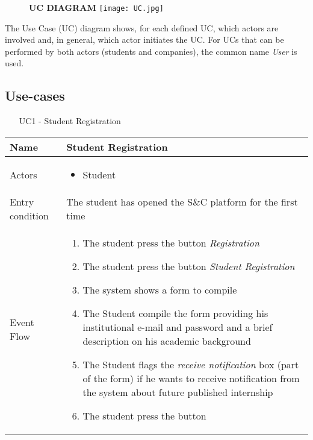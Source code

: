 			\begin{figure}[H]
				\centering
				{\bfseries UC DIAGRAM}
				\texttt{[image: UC.jpg]}
				
			\end{figure}
			
			The Use Case (UC) diagram shows, for each defined UC, which actors are involved and, in general, which actor initiates the UC. For UCs that can be performed by both actors (students and companies), the common name \textit{User} is used.
			
			
			
		\subsection{Use-cases}
			
			\begin{table} [H]
				\centering
				\begin{itemize}
					\item [UC1] - Student Registration
				\end{itemize}
				\begin{tabular}{|| P{7.5cm} | P{7.5cm} ||}
					\hline
					Name & Student Registration \\
					\hline
					Actors & \parbox{5cm}{\begin{itemize}
							\item Student
							\end{itemize}
						} \\
					\hline
					Entry condition & The student has opened the S\&C platform for the first time \\
					\hline
					Event Flow & \parbox{5cm}{\begin{enumerate}[label=\alpha]
						\item The student press the button \textit{Registration}
						\item The student press the button \textit{Student Registration}
						\item The system shows a form to compile
						\item The Student compile the form providing his institutional e-mail and password and a brief description on his academic 
						background
						\item The Student flags the \textit{receive 
						notification} box (part of the form) 
						if he wants to receive notification 
						from the system about future 
						published internship 
						\item The student press the button 

\end{enumerate}}
\end{tabular}
\end{table}
